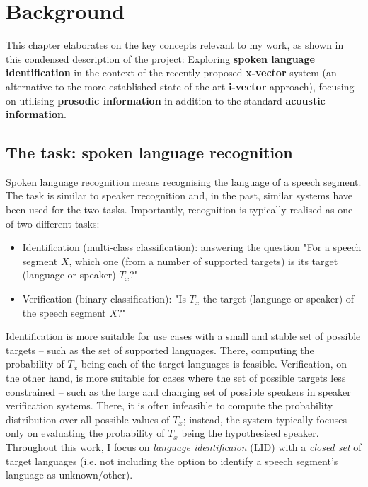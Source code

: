 \documentclass[bsc,frontabs,twoside,singlespacing,parskip,deptreport]{infthesis}
\begin{document}
\chapter{Background}{
  \label{chap:Background}
  This chapter elaborates on the key concepts relevant to my work, as shown in this condensed description of the project: Exploring \textbf{spoken language identification} in the context of the recently proposed \textbf{x-vector} system (an alternative to the more established state-of-the-art \textbf{i-vector} approach), focusing on utilising \textbf{prosodic information} in addition to the standard \textbf{acoustic information}.

  \section{The task: spoken language recognition}{
    \label{sec:LID}
    Spoken language recognition means recognising the language of a speech segment. The task is similar to speaker recognition and, in the past, similar systems have been used for the two tasks. Importantly, recognition is typically realised as one of two different tasks: 
    \begin{itemize}
      \item {Identification (multi-class classification): answering the question "For a speech segment $X$, which one (from a number of supported targets) is its target (language or speaker) $T_x$?"}
      \item {Verification (binary classification): "Is $T_x$ the target (language or speaker) of the speech segment $X$?"}
    \end{itemize}
    Identification is more suitable for use cases with a small and stable set of possible targets -- such as the set of supported languages. There, computing the probability of $T_x$ being each of the target languages is feasible. Verification, on the other hand, is more suitable for cases where the set of possible targets less constrained -- such as the large and changing set of possible speakers in speaker verification systems. There, it is often infeasible to compute the probability distribution over all possible values of $T_x$; instead, the system typically focuses only on evaluating the probability of $T_x$ being the hypothesised speaker. Throughout this work, I focus on \textit{language identificaion} (LID) with a \textit{closed set} of target languages (i.e. not including the option to identify a speech segment's language  as unknown/other).
  }

}
\end{document}
